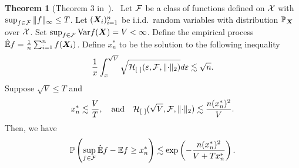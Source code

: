 \documentclass[twoside,11pt]{article}
\theoremstyle{definition}
\newtheorem{thm}{Theorem}
\begin{document}
\begin{thm}[Theorem 3 in~\cite{shen1994convergence}]~\label{thm:refer}Let $\mathcal{F}$ be a class of functions defined on $\mathcal{X}$ with $\sup_{f\in\mathcal{F}}\|f\|_{\infty}\leq T$. Let $(\bm X_i)_{i=1}^n$ be i.i.d.\ random variables with distribution $\mathbb{P}_{\bm X}$ over $\mathcal{X}$. Set $\sup_{f\in\mathcal{F}}\textup{Var}f(\bm X)=V<\infty$. 
Define the empirical process $\mathbb{\hat E}f={1\over n}\sum_{i=1}^n f(\bm X_i)$. 
Define $x_n^*$ to be the solution to the following inequality
\[
{1\over x}\int_x^{\sqrt{V}}\sqrt{\tH_{[\ ]}(\varepsilon,\tF,\vnormSize{}{\cdot})}d\varepsilon \lesssim \sqrt{n}.
\]
Suppose $\sqrt{V}\leq T$ and 
\[
x_n^*\lesssim {V\over T},\quad \text{and}\quad \mathcal{H}_{[\ ]}(\sqrt{V},\mathcal{F},\lVert\cdot\rVert_2)\lesssim {n(x_n^*)^2 \over V}.
\]
Then, we have
\begin{equation}\label{eq:oneside}
\mathbb{P}\left(\sup_{f\in\mathcal{F}}\mathbb{\hat E}f -\mathbb{E}f\geq x^*_n\right)\lesssim  \exp\left(-{n (x^*_n)^2\over V+Tx^*_n}\right). 
\end{equation}
\end{thm}
\end{document}

